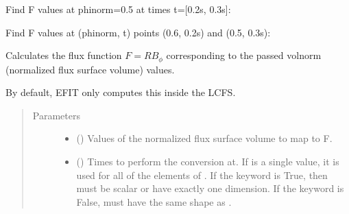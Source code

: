 \documentclass[letterpaper,10pt,english]{sphinxmanual}
\begin{document}
\begin{fulllineitems}
\begin{fulllineitems}
Find F values at phinorm=0.5 at times t={[}0.2s, 0.3s{]}:

\begin{sphinxVerbatim}[commandchars=\\\{\}]
   \PYG{p}{[} \PYG{p}{]}
\end{sphinxVerbatim}

Find F values at (phinorm, t) points (0.6, 0.2s) and (0.5, 0.3s):

\begin{sphinxVerbatim}[commandchars=\\\{\}]
  \PYG{p}{[} \PYG{p}{]} \PYG{p}{[} \PYG{p}{]} 
\end{sphinxVerbatim}

\end{fulllineitems}


\begin{fulllineitems}
\label{\detokenize{eqtools:eqtools.core.Equilibrium.volnorm2F}}
Calculates the flux function \(F=RB_{\phi}\) corresponding to the passed volnorm (normalized flux surface volume) values.

By default, EFIT only computes this inside the LCFS.
\begin{quote}\begin{description}
\item[{Parameters}] \leavevmode\begin{itemize}
\item {} 
 () \textendash{} Values of the normalized
flux surface volume to map to F.

\item {} 
 () \textendash{} Times to perform the conversion at.
If  is a single value, it is used for all of the elements of
. If the  keyword is True, then  must be scalar
or have exactly one dimension. If the  keyword is False,
 must have the same shape as .


\end{itemize}
\end{description}
\end{quote}
\end{fulllineitems}
\end{fulllineitems}
\end{document}

